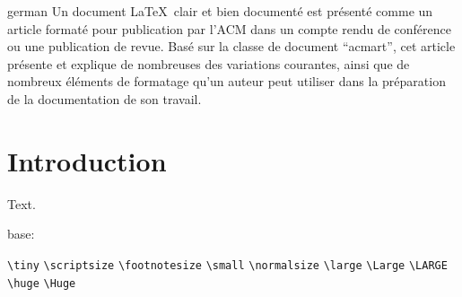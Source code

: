 \documentclass[sigconf, language=english, language=german,language=french]{acmart}
\begin{document}
\begin{translatedabstract}{german}
  Un document \LaTeX\ clair et bien documenté est présenté comme un
  article formaté pour publication par l'ACM dans un compte rendu de
  conférence ou une publication de revue. Basé sur la classe de
  document ``acmart'', cet article présente et explique de nombreuses
  des variations courantes, ainsi que de nombreux éléments de
  formatage qu'un auteur peut utiliser dans la préparation de la
  documentation de son travail.
\end{translatedabstract}

\maketitle
\section{Introduction}
Text.


\makeatletter
base: \f@size

\verb+\tiny+ \tiny \f@size
\verb+\scriptsize+ \scriptsize \f@size
\verb+\footnotesize+ \footnotesize \f@size
\verb+\small+ \small \f@size
\verb+\normalsize+ \normalsize \f@size
\verb+\large+ \large \f@size
\verb+\Large+ \Large \f@size
\verb+\LARGE+ \LARGE \f@size
\verb+\huge+ \huge \f@size
\verb+\Huge+ \Huge \f@size
\makeatother
\end{document}

